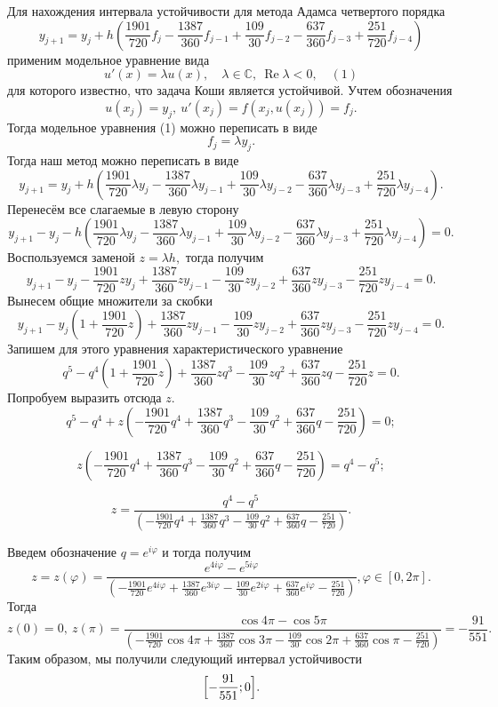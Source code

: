 \documentclass[11pt]{article}
\begin{document}
    Для нахождения интервала устойчивости для метода Адамса четвертого
порядка
\[y_{j+1} = y_j + h(\frac{1901}{720}f_j -\frac{1387}{360} f_{j-1} + \frac{109}{30} f_{j-2}-\frac{637}{360} f_{j-3} +\frac{251}{720} f_{j-4})\]
применим модельное уравнение вида
\[u'(x) = \lambda u(x),\quad \lambda \in \mathbb C,\ \operatorname{Re} \lambda < 0,\quad (1)\]
для которого известно, что задача Коши является устойчивой. Учтем
обозначения \[u(x_j)=y_j, \ u'(x_j)=f(x_j, u(x_j))=f_j.\] Тогда
модельное уравнения (1) можно переписать в виде \[f_j=\lambda y_j.\]
Тогда наш метод можно переписать в виде
\[y_{j+1} = y_j + h(\frac{1901}{720}\lambda y_j -\frac{1387}{360}\lambda y_{j-1} + \frac{109}{30}\lambda y_{j-2}-\frac{637}{360}\lambda y_{j-3} +\frac{251}{720}\lambda y_{j-4}).\]
Перенесём все слагаемые в левую сторону
\[y_{j+1} - y_j - h(\frac{1901}{720}\lambda y_j -\frac{1387}{360}\lambda y_{j-1} + \frac{109}{30}\lambda y_{j-2}-\frac{637}{360}\lambda y_{j-3} +\frac{251}{720}\lambda y_{j-4})=0.\]
Воспользуемся заменой \(z=\lambda h,\) тогда получим
\[y_{j+1} - y_j - \frac{1901}{720}z y_j +\frac{1387}{360}z y_{j-1} - \frac{109}{30}z y_{j-2}+\frac{637}{360}z y_{j-3} -\frac{251}{720}z y_{j-4}=0.\]
Вынесем общие множители за скобки
\[y_{j+1} - y_j(1 + \frac{1901}{720}z) +\frac{1387}{360}z y_{j-1} - \frac{109}{30}z y_{j-2}+\frac{637}{360}z y_{j-3} -\frac{251}{720}z y_{j-4}=0.\]
Запишем для этого уравнения характеристического уравнение
\[q^5 - q^4(1 + \frac{1901}{720}z) +\frac{1387}{360}z q^3 - \frac{109}{30}z q^2+\frac{637}{360}z q -\frac{251}{720}z =0.\]
Попробуем выразить отсюда \(z\).
\[q^5 - q^4 + z(- \frac{1901}{720}q^4 +\frac{1387}{360} q^3 - \frac{109}{30} q^2+\frac{637}{360} q -\frac{251}{720}) =0;\]

\[z(- \frac{1901}{720}q^4 +\frac{1387}{360} q^3 - \frac{109}{30} q^2+\frac{637}{360} q -\frac{251}{720}) =q^4-q^5;\]

\[z=\frac{q^4-q^5}{(- \frac{1901}{720}q^4 +\frac{1387}{360} q^3 - \frac{109}{30} q^2+\frac{637}{360} q -\frac{251}{720})}.\]

Введем обозначение \(q=e^{i\varphi}\) и тогда получим
\[z=z(\varphi)=\frac{e^{4i\varphi}-e^{5i\varphi}}{(- \frac{1901}{720}e^{4i\varphi} +\frac{1387}{360} e^{3i\varphi} - \frac{109}{30} e^{2i\varphi}+\frac{637}{360} e^{i\varphi} -\frac{251}{720})}, \varphi \in [0, 2\pi].\]
Тогда
\[z(0)=0, \ z(\pi)=\frac{\cos{4\pi}-\cos5\pi}{(- \frac{1901}{720}\cos{4\pi} +\frac{1387}{360} \cos{3\pi} - \frac{109}{30} \cos{2\pi}+\frac{637}{360} \cos{\pi} -\frac{251}{720})}=-\frac{91}{551}.\]
Таким образом, мы получили следующий интервал устойчивости
\[\Bigl[-\frac{91}{551}; 0\Bigr].\]
\end{document}
